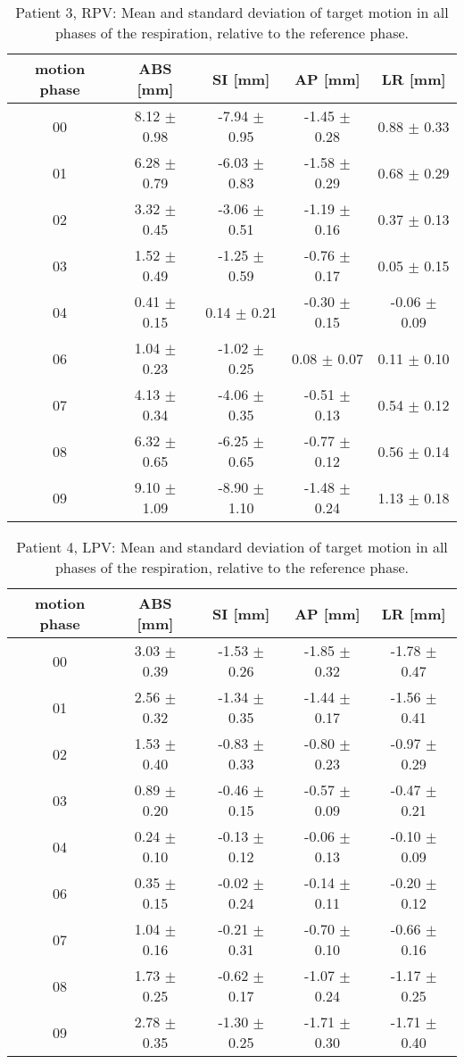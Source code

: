 \begin{table}[H]
  \centering
  \caption{Patient 3, RPV: Mean and standard deviation of target motion in all phases of the respiration, relative to the reference phase.}
  \begin{tabular}{|c|c|c|c|c|}
    \hline\hline
    motion phase & ABS [mm] & SI [mm] & AP [mm] & LR [mm]\\
    \hline 
00& 8.12 $\pm$ 0.98& -7.94 $\pm$ 0.95& -1.45 $\pm$ 0.28& 0.88 $\pm$ 0.33 \\
01& 6.28 $\pm$ 0.79& -6.03 $\pm$ 0.83& -1.58 $\pm$ 0.29& 0.68 $\pm$ 0.29 \\
02& 3.32 $\pm$ 0.45& -3.06 $\pm$ 0.51& -1.19 $\pm$ 0.16& 0.37 $\pm$ 0.13 \\
03& 1.52 $\pm$ 0.49& -1.25 $\pm$ 0.59& -0.76 $\pm$ 0.17& 0.05 $\pm$ 0.15 \\
04& 0.41 $\pm$ 0.15& 0.14 $\pm$ 0.21& -0.30 $\pm$ 0.15& -0.06 $\pm$ 0.09 \\
06& 1.04 $\pm$ 0.23& -1.02 $\pm$ 0.25& 0.08 $\pm$ 0.07& 0.11 $\pm$ 0.10 \\
07& 4.13 $\pm$ 0.34& -4.06 $\pm$ 0.35& -0.51 $\pm$ 0.13& 0.54 $\pm$ 0.12 \\
08& 6.32 $\pm$ 0.65& -6.25 $\pm$ 0.65& -0.77 $\pm$ 0.12& 0.56 $\pm$ 0.14 \\
09& 9.10 $\pm$ 1.09& -8.90 $\pm$ 1.10& -1.48 $\pm$ 0.24& 1.13 $\pm$ 0.18 \\
        \hline\hline
  \end{tabular}
\end{table}


\begin{table}[H]
  \centering
  \caption{Patient 4, LPV: Mean and standard deviation of target motion in all phases of the respiration, relative to the reference phase.}
  \begin{tabular}{|c|c|c|c|c|}
    \hline\hline
    motion phase & ABS [mm] & SI [mm] & AP [mm] & LR [mm]\\
    \hline 
00& 3.03 $\pm$ 0.39& -1.53 $\pm$ 0.26& -1.85 $\pm$ 0.32& -1.78 $\pm$ 0.47 \\
01& 2.56 $\pm$ 0.32& -1.34 $\pm$ 0.35& -1.44 $\pm$ 0.17& -1.56 $\pm$ 0.41 \\
02& 1.53 $\pm$ 0.40& -0.83 $\pm$ 0.33& -0.80 $\pm$ 0.23& -0.97 $\pm$ 0.29 \\
03& 0.89 $\pm$ 0.20& -0.46 $\pm$ 0.15& -0.57 $\pm$ 0.09& -0.47 $\pm$ 0.21 \\
04& 0.24 $\pm$ 0.10& -0.13 $\pm$ 0.12& -0.06 $\pm$ 0.13& -0.10 $\pm$ 0.09 \\
06& 0.35 $\pm$ 0.15& -0.02 $\pm$ 0.24& -0.14 $\pm$ 0.11& -0.20 $\pm$ 0.12 \\
07& 1.04 $\pm$ 0.16& -0.21 $\pm$ 0.31& -0.70 $\pm$ 0.10& -0.66 $\pm$ 0.16 \\
08& 1.73 $\pm$ 0.25& -0.62 $\pm$ 0.17& -1.07 $\pm$ 0.24& -1.17 $\pm$ 0.25 \\
09& 2.78 $\pm$ 0.35& -1.30 $\pm$ 0.25& -1.71 $\pm$ 0.30& -1.71 $\pm$ 0.40 \\
        \hline\hline
  \end{tabular}
\end{table}

